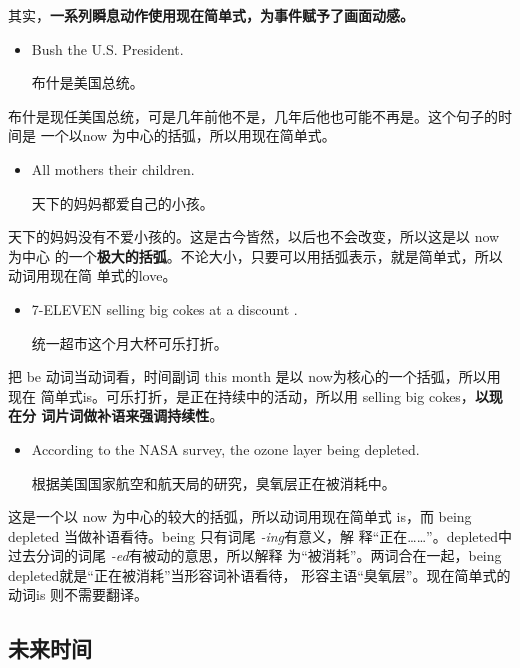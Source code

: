 其实，\textbf{一系列瞬息动作使用现在简单式，为事件赋予了画面动感。}

\begin{itemize}
\item  Bush  the U.S. President.

  布什是美国总统。
\end{itemize}

布什是现任美国总统，可是几年前他不是，几年后他也可能不再是。这个句子的时间是
一个以now 为中心的括弧，所以用现在简单式。

\begin{itemize}
\item  All mothers  their children.

  天下的妈妈都爱自己的小孩。
\end{itemize}

天下的妈妈没有不爱小孩的。这是古今皆然，以后也不会改变，所以这是以 now为中心
的一个\textbf{极大的括弧}。不论大小，只要可以用括弧表示，就是简单式，所以动词用现在简
单式的love。

\begin{itemize}
\item  7-ELEVEN  selling big cokes at a discount .

  统一超市这个月大杯可乐打折。
\end{itemize}

把 be 动词当动词看，时间副词 this month 是以 now为核心的一个括弧，所以用现在
简单式is。可乐打折，是正在持续中的活动，所以用 selling big cokes，\textbf{以现在分
  词片词做补语来强调持续性}。

\begin{itemize}
\item According to the NASA survey, the ozone layer  being depleted.

  根据美国国家航空和航天局的研究，臭氧层正在被消耗中。
\end{itemize}

这是一个以 now 为中心的较大的括弧，所以动词用现在简单式 is，而 being
depleted 当做补语看待。being 只有词尾 \emph{-ing}有意义，解
释“正在……”。depleted中过去分词的词尾 \emph{-ed}有被动的意思，所以解释
为“被消耗”。两词合在一起，being depleted就是“正在被消耗”当形容词补语看待，
形容主语“臭氧层”。现在简单式的动词is 则不需要翻译。

\subsection{未来时间}

